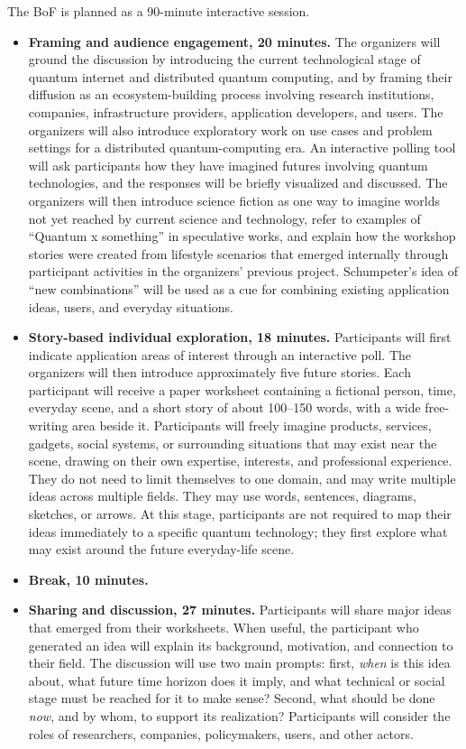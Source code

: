 \documentclass[10pt,conference]{IEEEtran}
\begin{document}
The BoF is planned as a 90-minute interactive session.

\begin{itemize}
\item \textbf{Framing and audience engagement, 20 minutes.} The organizers will ground the discussion by introducing the current technological stage of quantum internet and distributed quantum computing, and by framing their diffusion as an ecosystem-building process involving research institutions, companies, infrastructure providers, application developers, and users. The organizers will also introduce exploratory work on use cases and problem settings for a distributed quantum-computing era. An interactive polling tool will ask participants how they have imagined futures involving quantum technologies, and the responses will be briefly visualized and discussed. The organizers will then introduce science fiction as one way to imagine worlds not yet reached by current science and technology, refer to examples of ``Quantum x something'' in speculative works, and explain how the workshop stories were created from lifestyle scenarios that emerged internally through participant activities in the organizers' previous project. Schumpeter's idea of ``new combinations'' will be used as a cue for combining existing application ideas, users, and everyday situations.
\item \textbf{Story-based individual exploration, 18 minutes.} Participants will first indicate application areas of interest through an interactive poll. The organizers will then introduce approximately five future stories. Each participant will receive a paper worksheet containing a fictional person, time, everyday scene, and a short story of about 100--150 words, with a wide free-writing area beside it. Participants will freely imagine products, services, gadgets, social systems, or surrounding situations that may exist near the scene, drawing on their own expertise, interests, and professional experience. They do not need to limit themselves to one domain, and may write multiple ideas across multiple fields. They may use words, sentences, diagrams, sketches, or arrows. At this stage, participants are not required to map their ideas immediately to a specific quantum technology; they first explore what may exist around the future everyday-life scene.
\item \textbf{Break, 10 minutes.}
\item \textbf{Sharing and discussion, 27 minutes.} Participants will share major ideas that emerged from their worksheets. When useful, the participant who generated an idea will explain its background, motivation, and connection to their field. The discussion will use two main prompts: first, \emph{when} is this idea about, what future time horizon does it imply, and what technical or social stage must be reached for it to make sense? Second, what should be done \emph{now}, and by whom, to support its realization? Participants will consider the roles of researchers, companies, policymakers, users, and other actors.

\end{itemize}
\end{document}
